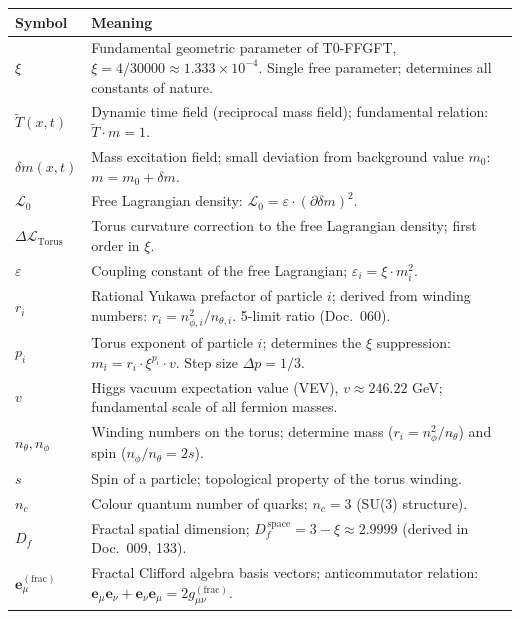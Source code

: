 \begin{longtable}{lp{9.5cm}}
\toprule
\textbf{Symbol} & \textbf{Meaning} \\
\midrule
\endhead
$\xi$ & Fundamental geometric parameter of T0-FFGFT,
        $\xi = 4/30000 \approx 1.333 \times 10^{-4}$.
        Single free parameter; determines all constants of nature. \\[4pt]
$\tilde{T}(x,t)$ & Dynamic time field (reciprocal mass field);
        fundamental relation: $\tilde{T} \cdot m = 1$. \\[4pt]
$\delta m(x,t)$ & Mass excitation field; small deviation from
        background value $m_0$: $m = m_0 + \delta m$. \\[4pt]
$\mathcal{L}_0$ & Free Lagrangian density:
        $\mathcal{L}_0 = \varepsilon \cdot (\partial\delta m)^2$. \\[4pt]
$\Delta\mathcal{L}_{\mathrm{Torus}}$ & Torus curvature correction
        to the free Lagrangian density; first order in $\xi$. \\[4pt]
$\varepsilon$ & Coupling constant of the free Lagrangian;
        $\varepsilon_i = \xi \cdot m_i^2$. \\[4pt]
$r_i$ & Rational Yukawa prefactor of particle $i$;
        derived from winding numbers: $r_i = n_{\phi,i}^2/n_{\theta,i}$.
        5-limit ratio (Doc.~060). \\[4pt]
$p_i$ & Torus exponent of particle $i$; determines the
        $\xi$ suppression: $m_i = r_i \cdot \xi^{p_i} \cdot v$.
        Step size $\Delta p = 1/3$. \\[4pt]
$v$ & Higgs vacuum expectation value (VEV),
        $v \approx 246.22$ GeV; fundamental scale of all fermion masses. \\[4pt]
$n_\theta, n_\phi$ & Winding numbers on the torus;
        determine mass ($r_i = n_\phi^2/n_\theta$) and
        spin ($n_\phi/n_\theta = 2s$). \\[4pt]
$s$ & Spin of a particle; topological property of
        the torus winding. \\[4pt]
$n_c$ & Colour quantum number of quarks; $n_c = 3$ (SU(3) structure). \\[4pt]
$D_f$ & Fractal spatial dimension;
        $D_f^{\,\text{space}} = 3 - \xi \approx 2.9999$
        (derived in Doc.~009, 133). \\[4pt]
$\mathbf{e}_\mu^{(\mathrm{frac})}$ & Fractal Clifford algebra basis vectors;
        anticommutator relation:
        $\mathbf{e}_\mu\mathbf{e}_\nu + \mathbf{e}_\nu\mathbf{e}_\mu
        = 2g_{\mu\nu}^{(\mathrm{frac})}$. \\[4pt]

\end{longtable}
